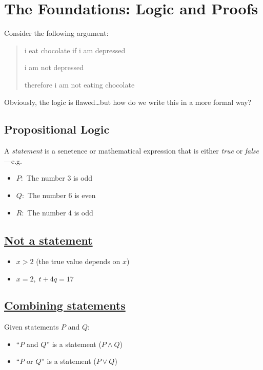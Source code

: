 \documentclass[../main.tex]{subfiles}
\begin{document}
\pagestyle{fancy}


\section{The Foundations: Logic and Proofs}

Consider the following argument:
\begin{quotation}
    i eat chocolate if i am depressed

    i am not depressed

    therefore i am not eating chocolate
\end{quotation}
Obviously, the logic is flawed\dots but how do we write this in a more formal way?

\subsection{Propositional Logic}

A \emph{statement} is a senetence or mathematical expression that is either \emph{true} or
\emph{false}---e.g.
\begin{itemize}
    \item $P:$ The number 3 is odd
    \item $Q:$ The number 6 is even
    \item $R:$ The number 4 is odd
\end{itemize}

\subsection*{\underline{Not a statement}}
\begin{itemize}
    \item $x > 2$ (the true value depends on $x$)
    \item $x = 2, \; t + 4q = 17$
\end{itemize}

\subsection*{\underline{Combining statements}}

Given statements $P$ and $Q$:
\begin{itemize}
    \item ``$P$ and $Q$'' is a statement ($P \land Q$)
    \item ``$P$ or $Q$'' is a statement ($P \lor Q$)
\end{itemize}
\end{document}
